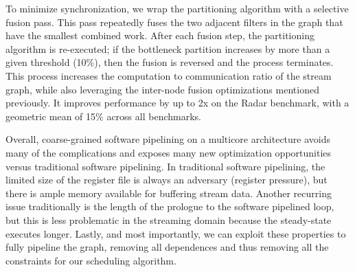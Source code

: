 To minimize synchronization, we wrap the partitioning algorithm with a
selective fusion pass.  This pass repeatedly fuses the two adjacent
filters in the graph that have the smallest combined work.  After each
fusion step, the partitioning algorithm is re-executed; if the
bottleneck partition increases by more than a given threshold (10\%),
then the fusion is reversed and the process terminates.  This process
increases the computation to communication ratio of the stream graph,
while also leveraging the inter-node fusion optimizations mentioned
previously.  It improves performance by up to 2x on the Radar
benchmark, with a geometric mean of 15\% across all benchmarks.

Overall, coarse-grained software pipelining on a multicore
architecture avoids many of the complications and exposes many new
optimization opportunities versus traditional software pipelining.  In
traditional software pipelining, the limited size of the register file
is always an adversary (register pressure), but there is ample memory
available for buffering stream data.
Another recurring issue traditionally is the length of the prologue to
the software pipelined loop, but this is less problematic in the
streaming domain because the steady-state executes longer.  Lastly,
and most importantly, we can exploit these properties to fully
pipeline the graph, removing all dependences and thus removing all the
constraints for our scheduling algorithm.


  
